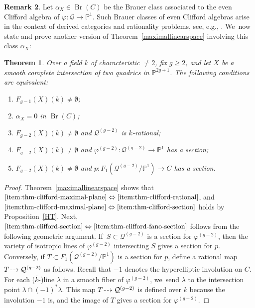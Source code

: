 \documentclass[JEP,XML,SOM,Unicode,NoEqCountersInSection,published]{cedram}
\newcommand{\dradpl}{{\hspace*{-2.5mm}\begin{tikzcd}[ampersand replacement=\&,column sep = scriptsize]\mbox{}\ar[r,dashed]\&\mbox{}\end{tikzcd}\hspace*{-2.5mm}}}
\newcommand{\dratst}{{\hspace*{-2.5mm}\begin{tikzcd}[ampersand replacement=\&,column sep = small]\mbox{}\ar[r,dashed]\&\mbox{}\end{tikzcd}\hspace*{-2mm}}}
\let\drascst\dratst
\newcommand{\dra}{\mathchoice{\dradpl}{\dratst}{\drascst}{\drascst}}
\let \dashrightarrow\dra
\theoremstyle{plain}
\newtheorem{thm}{Theorem}[section]
\theoremstyle{definition}
\newtheorem{rem}[thm]{Remark}
\DeclareMathOperator{\Br}{Br}
\newcommand{\kbar}{{\overline{k}}}
\let\phi\varphi
\renewcommand\P{\mathbb{P}}
\begin{document}
\begin{rem}
Let $\alpha_X \in \Br(C)$ be the Brauer class associated to the even Clifford algebra of $\phi\colon \mathcal{Q}\to \P^1$. Such Brauer classes of even Clifford algebras arise in the context of derived categories and rationality problems, see, e.g., \cite{ABB14}. We~now state and prove another version of Theorem~\ref{maximallinearspace} involving this class \(\alpha_X\):

\begin{thm}\label{thm:clifford-algebra}
Over a field $k$ of characteristic $\neq 2$, fix $g\geq 2$, and let $X$ be a smooth complete intersection of two quadrics in $\P^{2g+1}$.
The following conditions are equivalent:
\begin{enumerate}
\item\label{item:thm-clifford-maximal-plane} $F_{g-1}(X)(k)\neq \emptyset$;
\item\label{item:thm-clifford-br-trivial} $\alpha_X =0$ in $\Br(C)$;
\item\label{item:thm-clifford-rational} $F_{g-2}(X)(k)\neq \emptyset$ and $\mathcal{Q}^{(g-2)}$ is $k$\nobreakdash-rational;
\item\label{item:thm-clifford-section} $F_{g-2}(X)(k)\neq \emptyset$ and $\phi^{(g-2)}\colon \mathcal{Q}^{(g-2)}\to \P^1$ has a section;
\item\label{item:thm-clifford-fano-section} $F_{g-2}(X)(k)\neq \emptyset$ and $p\colon F_1(\mathcal{Q}^{(g-2)}/\P^1)\to C$ has a section.
\end{enumerate}
\end{thm}

\begin{proof}
Theorem~\ref{maximallinearspace} shows that $\eqref{item:thm-clifford-maximal-plane}\Leftrightarrow\eqref{item:thm-clifford-rational}$, and $\eqref{item:thm-clifford-maximal-plane}\Leftrightarrow\eqref{item:thm-clifford-section}$ holds by Proposition~\ref{HT}.
Next, $\eqref{item:thm-clifford-section}\Leftrightarrow\eqref{item:thm-clifford-fano-section}$ follows from the following geometric argument. If~$S\subset \mathcal{Q}^{(g-2)}$ is a section for $\phi^{(g-2)}$, then the variety of isotropic lines of $\phi^{(g-2)}$ intersecting $S$ gives a section for $p$.
Conversely, if $T\subset F_1(\mathcal{Q}^{(g-2)}/\P^1)$ is a section for $p$, define a rational map $T\dashrightarrow \mathcal{Q}^{(g-2)}$ as follows. Recall that \(-1\) denotes the hyperelliptic involution on \(C\). For each (\(\kbar\)-)line \(\lambda\) in a smooth fiber of \(\phi^{(g-2)}\), we~send \(\lambda\) to the intersection point \(\lambda \cap (-1)^*\lambda\). This map $T\dashrightarrow \mathcal{Q}^{(g-2)}$ is defined over $k$ because the involution $-1$ is, and the image of \(T\) gives a section for $\phi^{(g-2)}$.


\end{proof}
\end{rem}
\end{document}
